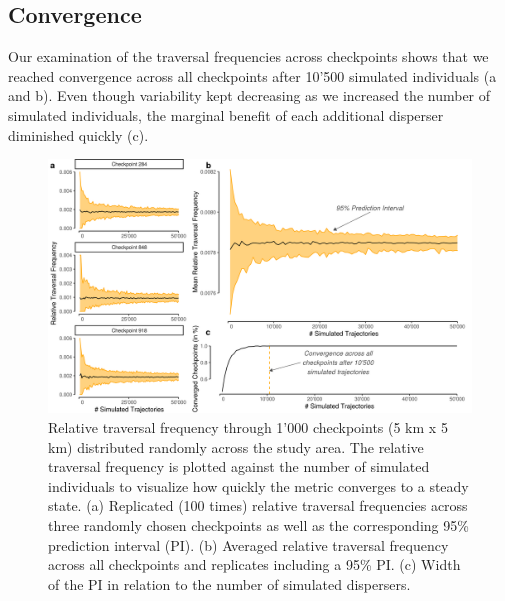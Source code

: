\documentclass[abstract=on,10pt,a4paper,bibliography=totocnumbered]{article}
\begin{document}
\subsection{Convergence}
Our examination of the traversal frequencies across checkpoints shows that we
reached convergence across all checkpoints after 10'500 simulated individuals
(a and b). Even though variability kept decreasing as we
increased the number of simulated individuals, the marginal benefit of each
additional disperser diminished quickly (c).

\begin{figure}
  \begin{center}
    \includegraphics[width=\textwidth]{99_Convergence}
    \caption{Relative traversal frequency through 1'000 checkpoints (5 km x 5
    km) distributed randomly across the study area. The relative traversal
    frequency is plotted against the number of simulated individuals to
    visualize how quickly the metric converges to a steady state. (a) Replicated
    (100 times) relative traversal frequencies across three randomly chosen
    checkpoints as well as the corresponding 95\% prediction interval (PI). (b)
    Averaged relative traversal frequency across all checkpoints and replicates
    including a 95\% PI. (c) Width of the PI in relation to the number of
    simulated dispersers.}
    \label{Convergence}
  \end{center}
\end{figure}
\end{document}
